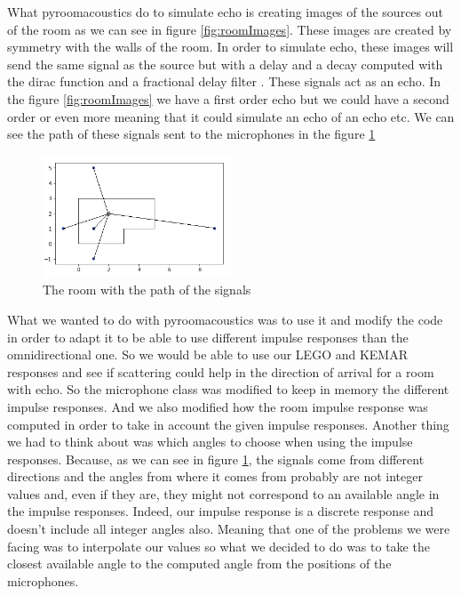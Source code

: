 What pyroomacoustics do to simulate echo is creating images of the sources out of the room as we can see in figure \ref{fig:roomImages}. These images are created by symmetry with the walls of the room. In order to simulate echo, these images will send the same signal as the source but with a delay and a decay computed with the dirac function and a fractional delay filter \cite{vesaVal}. These signals act as an echo. In the figure \ref{fig:roomImages} we have a first order echo but we could have a second order or even more meaning that it could simulate an echo of an echo etc. We can see the path of these signals sent to the microphones in the figure \ref{fig:roomImagesTrait}

\begin{figure}[h]
\centering
\caption{The room with the path of the signals}
\centering
\label{fig:roomImagesTrait}
\includegraphics[width=0.5\textwidth]{roomWithImagesAndTrait.png}
\end{figure}

What we wanted to do with pyroomacoustics was to use it and modify the code in order to adapt it to be able to use different impulse responses than the omnidirectional one. So we would be able to use our LEGO and KEMAR responses and see if scattering could help in the direction of arrival for a room with echo. So the microphone class was modified to keep in memory the different impulse responses. And we also modified how the room impulse response was computed in order to take in account the given impulse responses. Another thing we had to think about was which angles to choose when using the impulse responses. Because, as we can see in figure \ref{fig:roomImagesTrait}, the signals come from different directions and the angles from where it comes from probably are not integer values and, even if they are, they might not correspond to an available angle in the impulse responses. Indeed, our impulse response is a discrete response and doesn't include all integer angles also. Meaning that one of the problems we were facing was to interpolate our values so what we decided to do was to take the closest available angle to the computed angle from the positions of the microphones.

